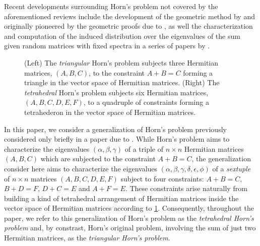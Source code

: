 \documentclass[notitlepage, 10pt]{article}
\begin{document}
Recent developments surrounding Horn's problem not covered by the aforementioned reviews include the development of the geometric method by \citeauthor{sherman2015geometric} \cite{sherman2015geometric} and \citeauthor{berline2018horn} \cite{berline2018horn} originally pioneered by the geometric proofs due to \citeauthor{belkale2002geometric} \cite{belkale2002geometric,belkale2005geometric}, as well the characterization and computation of the induced distribution over the eigenvalues of the sum given random matrices with fixed spectra in a series of papers by \citeauthor{coquereaux2018orbital} \cite{coquereaux2018orbital,coquereaux2018orbital,coquereaux2019revisiting,zuber2018horn}.
\begin{center}%
    \begin{figure}%
        \caption{(Left) The \textit{triangular} Horn's problem subjects three Hermitian matrices, $(A,B,C)$, to the constraint $A+B=C$ forming a triangle in the vector space of Hermitian matrices. (Right) The \textit{tetrahedral} Horn's problem subjects six Hermitian matrices, $(A,B,C,D,E,F)$, to a quadruple of constraints forming a tetrahederon in the vector space of Hermitian matrices.}%
        \label{fig:tetrahedron_labelling_scheme}%
    \end{figure}%
\end{center}%
In this paper, we consider a generalization of Horn's problem previously considered only briefly in a paper due to \citeauthor{christandl2018recoupling} \cite{christandl2018recoupling}.
While Horn's problem aims to characterize the eigenvalues $(\alpha, \beta, \gamma)$ of a triple of $n\times n$ Hermitian matrices $(A,B,C)$ which are subjected to the constraint $A+B=C$, the generalization consider here aims to characterize the eigenvalues $(\alpha,\beta,\gamma,\delta,\epsilon,\phi)$ of a \textit{sextuple} of $n\times n$ matrices $(A,B,C,D,E,F)$ subject to four constraints: $A+B=C$, $B+D=F$, $D+C=E$ and $A+F=E$.
These constraints arise naturally from building a kind of tetrahedral arrangement of Hermitian matrices inside the vector space of Hermitian matrices according to \cref{fig:tetrahedron_labelling_scheme}.
Consequently, throughout the paper, we refer to this generalization of Horn's problem as the \textit{tetrahedral Horn's problem} and, by constrast, Horn's original problem, involving the sum of just two Hermitian matrices, as the \textit{triangular Horn's problem}.
\end{document}
